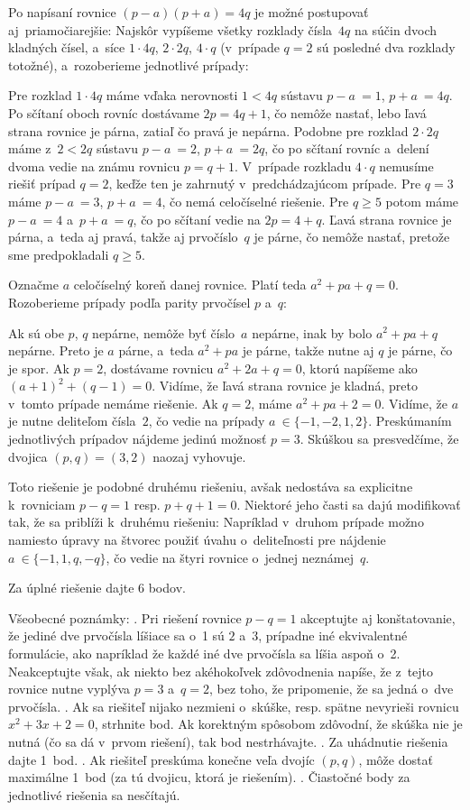 {\poznamka
Po napísaní rovnice
$(p-a) (p+a) = 4q$ je možné postupovať aj~priamočiarejšie: Najskôr
vypíšeme všetky rozklady čísla~$4q$ na súčin dvoch kladných
čísel, a~síce $1 \cdot 4q$, $2 \cdot 2q$, $4 \cdot q$ (v~prípade
$q = 2$ sú posledné dva rozklady totožné), a~rozoberieme jednotlivé
prípady:

\*
Pre rozklad $1 \cdot 4q$ máme vďaka nerovnosti $1 <4q$ sústavu $p-a~= 1$,
$p+a~= 4q$. Po sčítaní oboch rovníc dostávame $2p = 4q+1$, čo
nemôže nastať, lebo ľavá strana rovnice je párna, zatiaľ čo pravá je nepárna.
\*
Podobne pre rozklad $2 \cdot 2q$ máme z~$2 <2q$ sústavu $p-a~= 2$,
$p+a~= 2q$, čo po sčítaní rovníc a~delení dvoma vedie na známu
rovnicu $p = q+1$.
\*
V~prípade rozkladu $4 \cdot q$ nemusíme riešiť prípad $q = 2$,
keďže ten je zahrnutý v~predchádzajúcom prípade. Pre $q = 3$ máme
$p-a~= 3$, $p+a~= 4$, čo nemá celočíselné riešenie. Pre $q \ge 5$
potom máme $p-a~= 4$ a~$p+a~= q$, čo po sčítaní vedie na $2p = 4+q$.
Ľavá strana rovnice je párna, a~teda aj pravá, takže
aj prvočíslo~$q$ je párne, čo nemôže nastať, pretože sme predpokladali $q\ge 5$.


Označme $a$ celočíselný
koreň danej rovnice. Platí teda $a^2+pa+q = 0$. Rozoberieme prípady
podľa parity prvočísel $p$ a~$q$:

\*
Ak sú obe $p$, $q$ nepárne, nemôže byť číslo~$a$ nepárne, inak
by bolo $a^2+pa+q$ nepárne. Preto je $a$ párne, a~teda $a^2+pa$
je párne, takže nutne aj $q$ je párne, čo je spor.
\*
Ak $p = 2$, dostávame rovnicu $a^2+2a+q = 0$, ktorú napíšeme ako
$(a+1)^2+{(q-1)} = 0$. Vidíme, že ľavá strana rovnice je kladná,
preto v~tomto prípade nemáme riešenie.
\*
Ak $q = 2$, máme $a^2+pa+2 = 0$. Vidíme, že $a$ je nutne
deliteľom čísla~$2$, čo vedie na prípady $a~\in \{{-1},{-2}, 1, 2\}$.
Preskúmaním jednotlivých prípadov nájdeme jedinú možnosť $p = 3$.
Skúškou sa presvedčíme, že dvojica $(p, q)=(3, 2)$ naozaj
vyhovuje.

\poznamka
Toto riešenie je podobné
druhému riešeniu, avšak nedostáva sa explicitne k~rovniciam $p-q = 1$
resp. $p+q+1 = 0$. Niektoré jeho časti sa dajú modifikovať tak, že
sa priblíži k~druhému riešeniu: Napríklad v~druhom prípade možno
namiesto úpravy na štvorec použiť úvahu o~deliteľnosti pre
nájdenie $a~\in \{{-1}, 1, q,{-q}\}$, čo vedie na štyri rovnice o~jednej
neznámej~$q$.


\schemaABC
Za úplné riešenie dajte 6 bodov.

{Všeobecné poznámky:}
. Pri riešení rovnice $p-q = 1$ akceptujte aj konštatovanie, že
jediné dve prvočísla líšiace sa o~1 sú $2$ a~$3$, prípadne iné
ekvivalentné formulácie, ako napríklad že každé iné dve
prvočísla sa líšia aspoň o~2. Neakceptujte však, ak niekto bez
akéhokoľvek zdôvodnenia napíše, že z~tejto rovnice nutne vyplýva
$p = 3$ a~$q = 2$, bez toho, že pripomenie, že sa jedná o~dve prvočísla.
. Ak sa riešiteľ nijako nezmieni o~skúške, resp. spätne
nevyrieši rovnicu $x^2+3x+2 = 0$, strhnite bod. Ak korektným
spôsobom zdôvodní, že skúška nie je nutná (čo sa dá v~prvom
riešení), tak bod nestrhávajte.
. Za uhádnutie riešenia dajte 1~bod.
. Ak riešiteľ preskúma konečne veľa dvojíc $(p, q)$,
môže dostať maximálne 1~bod (za tú dvojicu, ktorá je riešením).
. Čiastočné body za jednotlivé riešenia sa nesčítajú.

}
